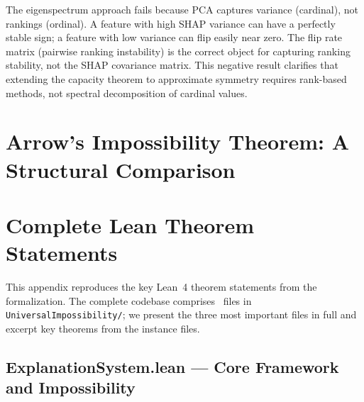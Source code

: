 \documentclass[11pt,a4paper]{article}
\begin{document}
The eigenspectrum approach fails because PCA captures variance (cardinal), not rankings (ordinal).  A feature with high SHAP variance can have a perfectly stable sign; a feature with low variance can flip easily near zero.  The flip rate matrix (pairwise ranking instability) is the correct object for capturing ranking stability, not the SHAP covariance matrix.  This negative result clarifies that extending the capacity theorem to approximate symmetry requires rank-based methods, not spectral decomposition of cardinal values.





\clearpage
\appendix

\section{Arrow's Impossibility Theorem: A Structural Comparison}
\label{app:arrow}



\section{Complete Lean Theorem Statements}
\label{app:lean}

This appendix reproduces the key Lean~4 theorem statements from the
formalization.  The complete codebase comprises \ClaimMainFiles~files in
\texttt{UniversalImpossibility/}; we present the three most important files
in full and excerpt key theorems from the instance files.

\subsection{ExplanationSystem.lean --- Core Framework and Impossibility}
\label{app:lean-explanation-system}
\end{document}
